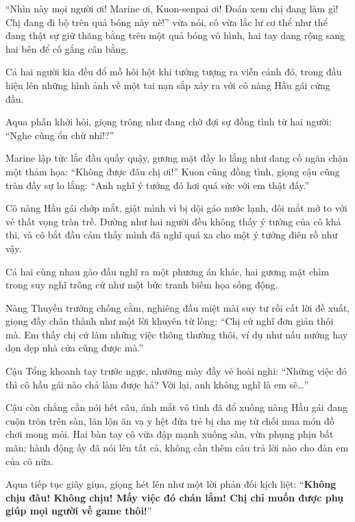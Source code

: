 \documentclass[../main.tex]{subfiles}
\begin{document}

``Nhìn này mọi người ơi! Marine ơi, Kuon-senpai ơi! Đoán xem chị đang làm gì! Chị đang đi bộ trên quả bóng này nè!'' vừa nói, cô vừa lắc lư cơ thể như thể đang thật sự giữ thăng bằng trên một quả bóng vô hình, hai tay dang rộng sang hai bên để cố gắng cân bằng.

Cả hai người kia đều đổ mồ hôi hột khi tưởng tượng ra viễn cảnh đó, trong đầu hiện lên những hình ảnh về một tai nạn sắp xảy ra với cô nàng Hầu gái cứng đầu.

Aqua phấn khởi hỏi, giọng trông như đang chờ đợi sự đồng tình từ hai người: ``Nghe cũng ổn chứ nhỉ!?''

Marine lập tức lắc đầu quầy quậy, gương mặt đầy lo lắng như đang cố ngăn chặn một thảm họa: ``Không được đâu chị ơi!'' Kuon cũng đồng tình, giọng cậu cũng tràn đầy sự lo lắng: ``Anh nghĩ ý tưởng đó hơi quá sức với em thật đấy.''

Cô nàng Hầu gái chớp mắt, giật mình vì bị dội gáo nước lạnh, đôi mắt mở to với vẻ thất vọng tràn trề. Dường như hai người đều không thấy ý tưởng của cô khả thi, và cô bắt đầu cảm thấy mình đã nghĩ quá xa cho một ý tưởng điên rồ như vậy.

\ct

Cả hai cùng nhau gào đầu nghĩ ra một phương án khác, hai gương mặt chìm trong suy nghĩ trông cứ như một bức tranh biếm họa sống động.

Nàng Thuyền trưởng chống cằm, nghiêng đầu miệt mài suy tư rồi cất lời đề xuất, giọng đầy chân thành như một lời khuyên từ lòng: ``Chị cứ nghĩ đơn giản thôi mà. Em thấy chị cứ làm những việc thông thường thôi, ví dụ như nấu nướng hay dọn dẹp nhà cửa cũng được mà.''

Cậu Tổng khoanh tay trước ngực, nhướng mày đầy vẻ hoài nghi: ``Những việc đó thì cô hầu gái nào chả làm được hả? Với lại, anh không nghĩ là em sẽ\dots''

Cậu còn chẳng cần nói hết câu, ánh mắt vô tình đã đổ xuống nàng Hầu gái đang cuộn tròn trên sàn, lăn lộn ăn vạ y hệt đứa trẻ bị cha mẹ từ chối mua món đồ chơi mong mỏi. Hai bàn tay cô vừa đập mạnh xuống sàn, vừa phụng phịu bất mãn; hành động ấy đã nói lên tất cả, không cần thêm câu trả lời nào cho đàn em của cô nữa.


Aqua tiếp tục giãy giụa, giọng hét lên như một lời phản đối kịch liệt: ``\textbf{Không chịu đâu! Không chịu! Mấy việc đó chán lắm! Chị chỉ muốn được phụ giúp mọi người về game thôi!}''
\end{document}
